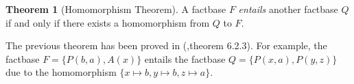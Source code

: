 \documentclass{article}
\theoremstyle{definition}
\newtheorem{theorem}{Theorem}[section]
\theoremstyle{remark}
\newcommand{\Terms}{\textbf{Terms}}
\begin{document}
\begin{theorem}[Homomorphism Theorem] \label{hom_thm}
A factbase $F$ \emph{entails} another factbase $Q$ if and only if there exists a homomorphism from $Q$ to $F$.
\end{theorem}

The previous theorem has been proved in (\cite{base},theorem 6.2.3). For example, the factbase $F = \{P(b,a),A(x)\}$ entails the factbase $Q = \{P(x,a),P(y,z)\}$ due to the homomorphism $\{x \mapsto b, y \mapsto b, z \mapsto a \}$.





\end{document}
